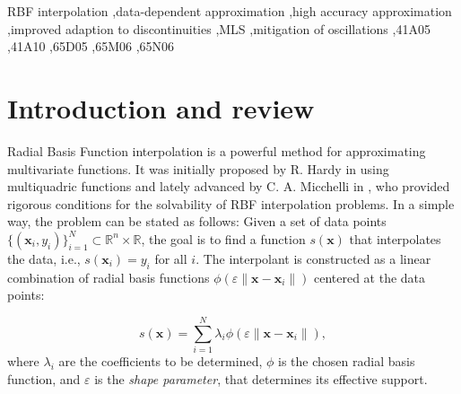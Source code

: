 \documentclass[preprint]{elsarticle}       %
\begin{document}
\begin{frontmatter}
\begin{abstract}
We prove the invertibility of the resulting interpolation matrix and propose a solution strategy that maintains the condition number comparable to that of a system where points near discontinuities are excluded. Numerical experiments in one and two dimensions demonstrate that the proposed method significantly reduces oscillations near discontinuities across various kernel types, whether locally or globally supported. At the same time, the interpolation accuracy and matrix conditioning in smooth regions remain essentially unchanged, as measured by the infinity norm of the error and the condition number.
\end{abstract}
\begin{keyword}
RBF interpolation \sep data-dependent approximation \sep high accuracy approximation \sep improved adaption to discontinuities \sep MLS \sep mitigation of oscillations    \sep 41A05 \sep  41A10 \sep 65D05 \sep 65M06 \sep 65N06
\end{keyword}
\end{frontmatter}



\section{Introduction and review}



Radial Basis Function  interpolation is a powerful method for approximating multivariate functions. It was initially proposed by R. Hardy in \cite{Hardy1971} using multiquadric functions and lately advanced by C. A. Micchelli in \cite{Micchelli1986}, who provided rigorous conditions for the solvability of RBF interpolation problems. In a simple way, the problem can be stated as follows: Given a set of data points $\{(\mathbf{x}_i, y_i)\}_{i=1}^N\subset \mathbb{R}^n\times \mathbb{R}$, the goal is to find a function $s(\mathbf{x})$ that interpolates the data, i.e., $s(\mathbf{x}_i) = y_i$ for all $i$. The interpolant is constructed as a linear combination of radial basis functions $\phi(\varepsilon\|\mathbf{x} - \mathbf{x}_i\|)$ centered at the data points:

\begin{equation}\label{interp1}
s(\mathbf{x}) = \sum_{i=1}^N \lambda_i \phi(\varepsilon\|\mathbf{x} - \mathbf{x}_i\|),
\end{equation}
where $\lambda_i$ are the coefficients to be determined, $\phi$ is the chosen radial basis function, and $\varepsilon$ is the {\it shape parameter}, that determines its effective support.
\end{document}
